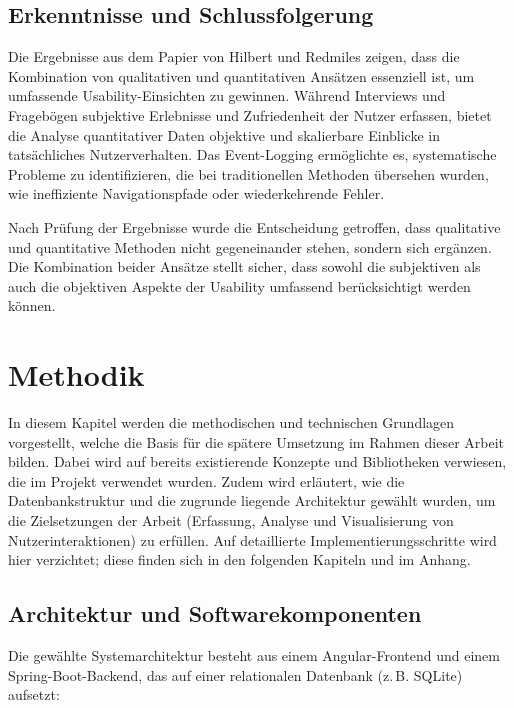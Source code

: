 \documentclass[12pt,oneside]{article}
\begin{document}
\subsection{Erkenntnisse und Schlussfolgerung}
Die Ergebnisse aus dem Papier von Hilbert und Redmiles \cite{Hilbert2000} zeigen, dass die Kombination von qualitativen und quantitativen Ansätzen essenziell ist, um umfassende Usability-Einsichten zu gewinnen. Während Interviews und Fragebögen subjektive Erlebnisse und Zufriedenheit der Nutzer erfassen, bietet die Analyse quantitativer Daten objektive und skalierbare Einblicke in tatsächliches Nutzerverhalten. Das Event-Logging ermöglichte es, systematische Probleme zu identifizieren, die bei traditionellen Methoden übersehen wurden, wie ineffiziente Navigationspfade oder wiederkehrende Fehler.

Nach Prüfung der Ergebnisse wurde die Entscheidung getroffen, dass qualitative und quantitative Methoden nicht gegeneinander stehen, sondern sich ergänzen. Die Kombination beider Ansätze stellt sicher, dass sowohl die subjektiven als auch die objektiven Aspekte der Usability umfassend berücksichtigt werden können.

\section{Methodik}
In diesem Kapitel werden die methodischen und technischen Grundlagen vorgestellt, welche die Basis für die spätere Umsetzung im Rahmen dieser Arbeit bilden. Dabei wird auf bereits existierende Konzepte und Bibliotheken verwiesen, die im Projekt verwendet wurden. Zudem wird erläutert, wie die Datenbankstruktur und die zugrunde liegende Architektur gewählt wurden, um die Zielsetzungen der Arbeit (Erfassung, Analyse und Visualisierung von Nutzerinteraktionen) zu erfüllen. Auf detaillierte Implementierungsschritte wird hier verzichtet; diese finden sich in den folgenden Kapiteln und im Anhang.

\subsection{Architektur und Softwarekomponenten}

Die gewählte Systemarchitektur besteht aus einem Angular-Frontend und einem Spring-Boot-Backend, das auf einer relationalen Datenbank (z.\,B. SQLite) aufsetzt:
\end{document}
